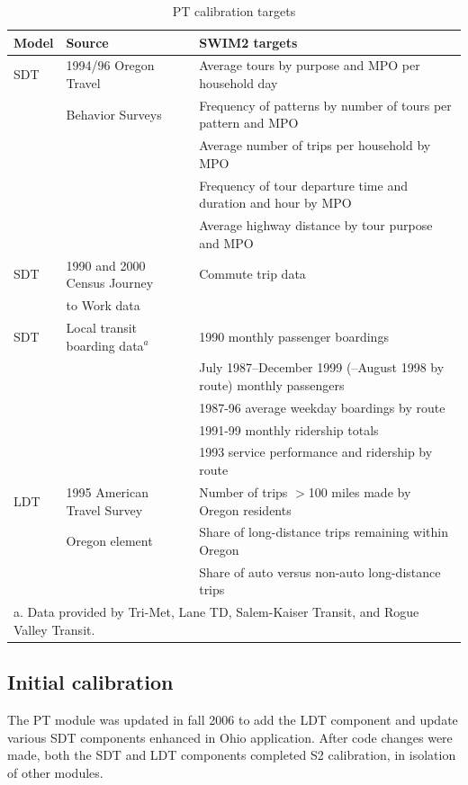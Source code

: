\begin{table}  %
\centering
\caption{PT calibration targets}\label{tab:pt-calibration-targets}
\begin{tabular}{lll}
\hline
Model & Source & SWIM2 targets \\
\hline
SDT & 1994/96 Oregon Travel & Average tours by purpose and MPO per household day \\
    & Behavior Surveys & Frequency of patterns by number of tours per pattern and MPO \\
    & & Average number of trips per household by MPO \\
    & & Frequency of tour departure time and duration and hour by MPO \\
    & & Average highway distance by tour purpose and MPO \\
\hline
SDT & 1990 and 2000 Census Journey & Commute trip data \\
    & to Work data \\
\hline
SDT & Local transit boarding data$^a$ & 1990 monthly passenger boardings \\
    & & July 1987--December 1999 (--August 1998 by route) monthly passengers \\
    & & 1987-96 average weekday boardings by route \\
    & & 1991-99 monthly ridership totals \\
    & & 1993 service performance and ridership by route \\
\hline
LDT & 1995 American Travel Survey & Number of trips $>$100 miles made by Oregon residents \\
    & Oregon element & Share of long-distance trips remaining within Oregon \\
    & & Share of auto versus non-auto long-distance trips \\
\hline
\multicolumn{3}{l}{\footnotesize a. Data provided by Tri-Met, Lane TD, Salem-Kaiser Transit, and Rogue Valley Transit.}
\end{tabular}
\end{table}

\subsection{Initial calibration}
The PT module was updated in fall 2006 to add the LDT component and update various SDT components enhanced in Ohio application. After code changes were made, both the SDT and LDT components completed S2 calibration, in isolation of other modules. 

